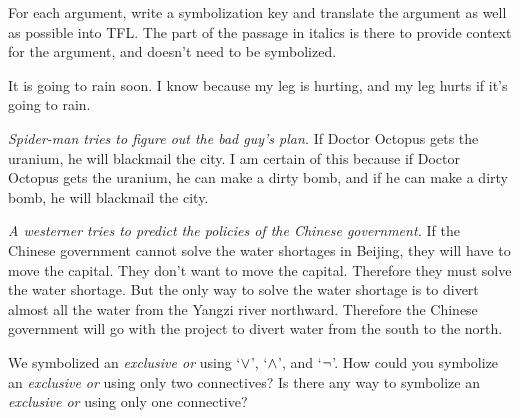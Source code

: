 \problempart
For each argument, write a symbolization key and translate the argument as well as possible into TFL. The part of the passage in italics is there to provide context for the argument, and doesn't need to be symbolized.
\begin{compactlist}
\item It is going to rain soon. I know because my leg is hurting, and my leg hurts if it's going to rain.

\item  \emph{Spider-man tries to figure out the bad guy's plan.} If Doctor Octopus gets the uranium, he will blackmail the city. I am certain of this because if Doctor Octopus gets the uranium, he can make a dirty bomb, and if he can make a dirty bomb, he will blackmail the city.

\item \emph{A westerner tries to predict the policies of the Chinese government.} If the Chinese government cannot solve the water shortages in Beijing, they will have to move the capital. They don't want to move the capital. Therefore they must solve the water shortage. But the only way to solve the water shortage is to divert almost all the water from the Yangzi river northward. Therefore the Chinese government will go with the project to divert water from the south to the north.       

\end{compactlist}

\problempart
We symbolized an \emph{exclusive or} using `$\vee$', `$\wedge$', and `$\neg$'. How could you symbolize an \emph{exclusive or} using only two connectives? Is there any way to symbolize an \emph{exclusive or} using only one connective?
\\

